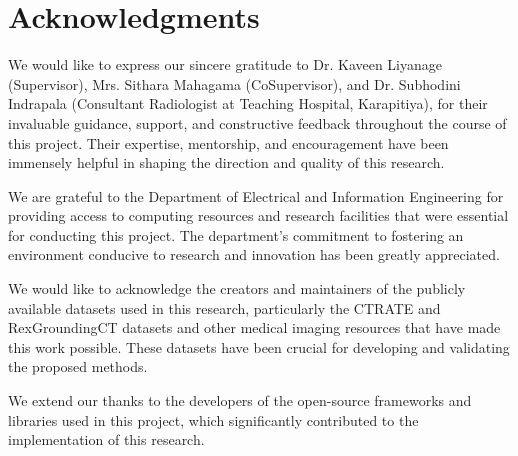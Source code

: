 ﻿
\chapter*{Acknowledgments}

We would like to express our sincere gratitude to Dr. Kaveen Liyanage (Supervisor), Mrs. Sithara Mahagama (CoSupervisor), and
Dr. Subhodini Indrapala (Consultant Radiologist at Teaching Hospital, Karapitiya), for their invaluable guidance, support, and constructive feedback throughout the
course of this project. Their expertise, mentorship, and encouragement have been immensely helpful in shaping the direction
and quality of this research.

We are grateful to the Department of Electrical and Information Engineering for providing access to computing resources and
research facilities that were essential for conducting this project. The department's commitment to fostering an environment
conducive to research and innovation has been greatly appreciated.

We would like to acknowledge the creators and maintainers of the publicly available datasets used in this research, particularly
the CTRATE and RexGroundingCT datasets and other medical imaging resources that have made this work possible. These datasets
have been crucial for developing and validating the proposed methods.

We extend our thanks to the developers of the open-source frameworks and libraries used in this project,
which significantly contributed to the implementation of this research.

